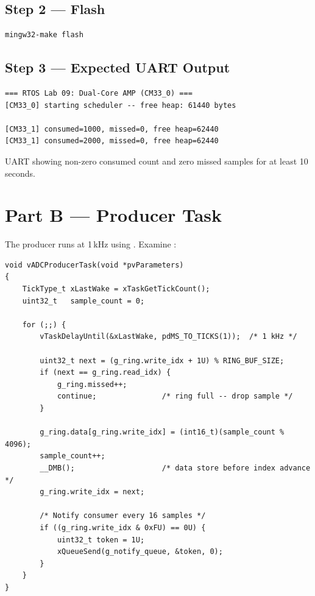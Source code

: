 \documentclass[11pt, a4paper]{article}
\begin{document}
\subsection{Step 2 --- Flash}

\begin{lstlisting}[style=bashstyle]
mingw32-make flash
\end{lstlisting}

\subsection{Step 3 --- Expected UART Output}

\begin{lstlisting}[style=textstyle]
=== RTOS Lab 09: Dual-Core AMP (CM33_0) ===
[CM33_0] starting scheduler -- free heap: 61440 bytes

[CM33_1] consumed=1000, missed=0, free heap=62440
[CM33_1] consumed=2000, missed=0, free heap=62440
\end{lstlisting}

\begin{checkpointbox}[~A]
  UART showing non-zero consumed count and zero missed samples for at least 10 seconds.
\end{checkpointbox}

\section{Part B --- Producer Task}

The producer runs at 1\,kHz using . Examine
:

\begin{lstlisting}[style=cstyle]
void vADCProducerTask(void *pvParameters)
{
    TickType_t xLastWake = xTaskGetTickCount();
    uint32_t   sample_count = 0;

    for (;;) {
        vTaskDelayUntil(&xLastWake, pdMS_TO_TICKS(1));  /* 1 kHz */

        uint32_t next = (g_ring.write_idx + 1U) % RING_BUF_SIZE;
        if (next == g_ring.read_idx) {
            g_ring.missed++;
            continue;               /* ring full -- drop sample */
        }

        g_ring.data[g_ring.write_idx] = (int16_t)(sample_count % 4096);
        sample_count++;
        __DMB();                    /* data store before index advance */
        g_ring.write_idx = next;

        /* Notify consumer every 16 samples */
        if ((g_ring.write_idx & 0xFU) == 0U) {
            uint32_t token = 1U;
            xQueueSend(g_notify_queue, &token, 0);
        }
    }
}
\end{lstlisting}
\end{document}
